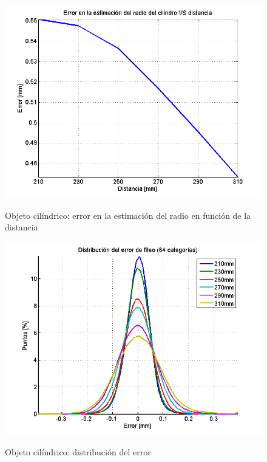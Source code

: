\begin{figure}[!bth]
    \myfloatalign
        {\includegraphics[width=1.0\linewidth]{scans/plotCylinderRadiusError}}
        \caption{Objeto cilíndrico: error en la estimación del radio en función de la distancia}
        \label{fig:cylinderRadiusErrorVsDistance}
\end{figure}

\begin{figure}[!bth]
    \myfloatalign
        {\includegraphics[width=1.0\linewidth]{scans/plotCylinder}}
        \caption{Objeto cilíndrico: distribución del error}
        \label{fig:cylinderFitErrorDistribution}
\end{figure}

